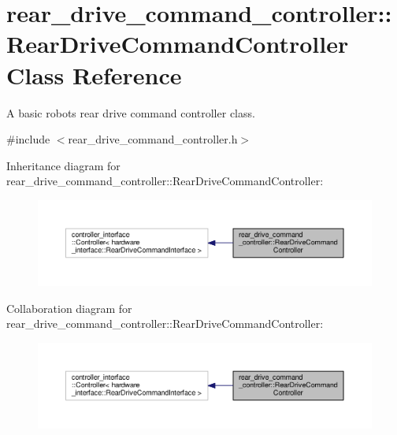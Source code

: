 \hypertarget{classrear__drive__command__controller_1_1RearDriveCommandController}{}\section{rear\+\_\+drive\+\_\+command\+\_\+controller\+:\+:Rear\+Drive\+Command\+Controller Class Reference}
\label{classrear__drive__command__controller_1_1RearDriveCommandController}


A basic robot\textquotesingle{}s rear drive command controller class.  




{\ttfamily \#include $<$rear\+\_\+drive\+\_\+command\+\_\+controller.\+h$>$}



Inheritance diagram for rear\+\_\+drive\+\_\+command\+\_\+controller\+:\+:Rear\+Drive\+Command\+Controller\+:\nopagebreak
\begin{figure}[H]
\begin{center}
\leavevmode
\includegraphics[width=350pt]{classrear__drive__command__controller_1_1RearDriveCommandController__inherit__graph}
\end{center}
\end{figure}


Collaboration diagram for rear\+\_\+drive\+\_\+command\+\_\+controller\+:\+:Rear\+Drive\+Command\+Controller\+:\nopagebreak
\begin{figure}[H]
\begin{center}
\leavevmode
\includegraphics[width=350pt]{classrear__drive__command__controller_1_1RearDriveCommandController__coll__graph}
\end{center}
\end{figure}
